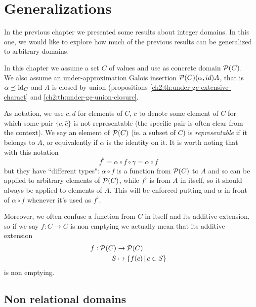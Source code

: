 \chapter{Generalizations}
In the previous chapter we presented some results about integer domains. In this one, we would like to explore how much of the previous results can be generalized to arbitrary domains.

In this chapter we assume a set $C$ of values and use as concrete domain $\mathcal{P}(C)$. We also assume an under-approximation Galois insertion $\mathcal{P}(C) (\alpha, id) A$, that is $\alpha \preceq \text{id}_C$ and $A$ is closed by union (propositions \ref{ch2:th:under-gc-extensive-charact} and \ref{ch2:th:under-gc-union-closure}.

As notation, we use $c, d$ for elements of $C$, $\bar{c}$ to denote some element of $C$ for which some pair $\{ c, \bar{c} \}$ is not representable (the specific pair is often clear from the context). We say an element of $\mathcal{P}(C)$ (ie. a subset of $C$) is \textit{representable} if it belongs to $A$, or equivalently if $\alpha$ is the identity on it. It is worth noting that with this notation
\[
f^{\flat} = \alpha \circ f \circ \gamma = \alpha \circ f
\]
but they have ``different types": $\alpha \circ f$ is a function from $\mathcal{P}(C)$ to $A$ and so can be applied to arbitrary elements of $\mathcal{P}(C)$, while $f^{\flat}$ is from $A$ in itself, so it should always be applied to elements of $A$. This will be enforced putting and $\alpha$ in front of $\alpha \circ f$ whenever it's used as $f^{\flat}$.

Moreover, we often confuse a function from $C$ in itself and its additive extension, so if we say $f: C \rightarrow C$ is non emptying we actually mean that its additive extension
\begin{align*}
	f: \mathcal{P}(C) &\rightarrow \mathcal{P}(C)	\\
	S & \mapsto \{ f(c) \,\vert\, c \in S \}
\end{align*}
is non emptying.

\section{Non relational domains}

